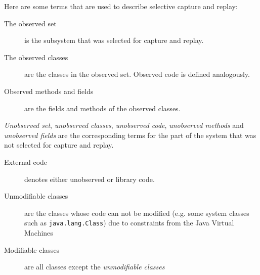 Here are some terms that are used to describe selective capture and replay:
\begin{description}
	\item [The observed set] is the subsystem that was selected for capture and replay.
	\item [The observed classes] are the classes in the observed set. Observed code is defined analogously.
	\item [Observed methods and fields] are the fields and methods of the observed classes.
\end{description}
\emph{Unobserved set},  \emph{unobserved classes}, \emph{unobserved code}, \emph{unobserved methods} and \emph{unobserved fields} are the corresponding terms for the part of the system that was not selected for capture and replay.
\begin{description}
	\item [External code] denotes either unobserved or library code.
	\item [Unmodifiable classes] are the classes whose code can not be modified (e.g. some system classes such as \texttt{java.lang.Class}) due to constraints from the Java Virtual Machines
	\item [Modifiable classes] are all classes except the \emph{unmodifiable classes}
\end{description}


